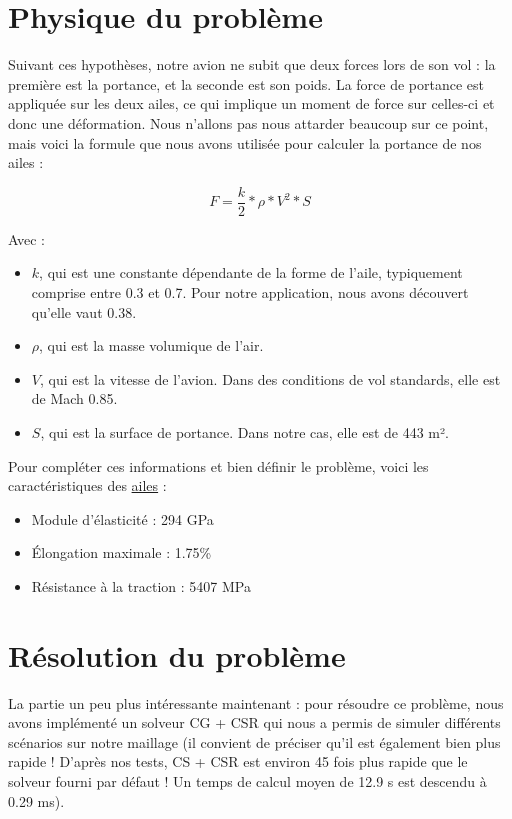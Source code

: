 \documentclass{article}
\begin{document}
\section{Physique du problème}
    Suivant ces hypothèses, notre avion ne subit que deux forces lors de son vol : la première est la portance, et la seconde est son poids. La force de portance est appliquée sur les deux ailes, ce qui implique un moment de force sur celles-ci et donc une déformation. Nous n'allons pas nous attarder beaucoup sur ce point, mais voici la formule que nous avons utilisée pour calculer la portance de nos ailes :

\[F = \frac{k}{2} * \rho * V^2 * S\]

Avec :
    \begin{itemize}
        \item \(k\), qui est une constante dépendante de la forme de l'aile, typiquement comprise entre 0.3 et 0.7. Pour notre application, nous avons découvert qu'elle vaut 0.38.
        \item \(\rho\), qui est la masse volumique de l'air.
        \item \(V\), qui est la vitesse de l'avion. Dans des conditions de vol standards, elle est de Mach 0.85.
        \item \(S\), qui est la surface de portance. Dans notre cas, elle est de 443 m².
    \end{itemize}
    Pour compléter ces informations et bien définir le problème, voici les caractéristiques des \href{https://gernitex.com/fr/ressources/fibre-de-carbone-proprietes/} {ailes} :
    \begin{itemize}
        \item Module d'élasticité : 294 GPa
        \item Élongation maximale : 1.75\%
        \item Résistance à la traction : 5407 MPa
    \end{itemize}

    
\section{Résolution du problème}
La partie un peu plus intéressante maintenant : pour résoudre ce problème, nous avons implémenté un solveur CG + CSR qui nous a permis de simuler différents scénarios sur notre maillage (il convient de préciser qu'il est également bien plus rapide ! D'après nos tests, CS + CSR est environ 45 fois plus rapide que le solveur fourni par défaut ! Un temps de calcul moyen de 12.9 s est descendu à 0.29 ms).
\end{document}
